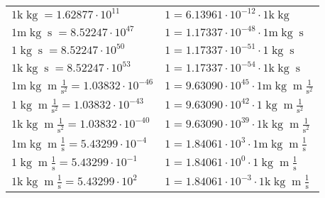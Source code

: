 \begin{center}
\begin{longtable}{l l}
{\color{gray}$1 \bm{\mathrm{ k}}\operatorname{kg}{}{}{}{} = 1.62877\cdot10^{11} $}   & {\color{gray}$ 1 = 6.13961\cdot10^{-12} \cdot 1 \bm{\mathrm{ k}}\operatorname{kg}{}{}{}{}$}  \\
{\color{gray}$1 \bm{\mathrm{ m}}\operatorname{kg}{}{\operatorname{s}}{}{} = 8.52247\cdot10^{47} $}   & {\color{gray}$ 1 = 1.17337\cdot10^{-48} \cdot 1 \bm{\mathrm{ m}}\operatorname{kg}{}{\operatorname{s}}{}{}$}  \\
{\color{black}$1 \bm{\mathrm{ }}\operatorname{kg}{}{\operatorname{s}}{}{} = 8.52247\cdot10^{50} $}   & {\color{black}$ 1 = 1.17337\cdot10^{-51} \cdot 1 \bm{\mathrm{ }}\operatorname{kg}{}{\operatorname{s}}{}{}$}  \\
{\color{gray}$1 \bm{\mathrm{ k}}\operatorname{kg}{}{\operatorname{s}}{}{} = 8.52247\cdot10^{53} $}   & {\color{gray}$ 1 = 1.17337\cdot10^{-54} \cdot 1 \bm{\mathrm{ k}}\operatorname{kg}{}{\operatorname{s}}{}{}$}  \\
{\color{gray}$1 \bm{\mathrm{ m}}\operatorname{kg}{\operatorname{m}}\frac1{\operatorname{s}^2}{}{} = 1.03832\cdot10^{-46} $}   & {\color{gray}$ 1 = 9.63090\cdot10^{45} \cdot 1 \bm{\mathrm{ m}}\operatorname{kg}{\operatorname{m}}\frac1{\operatorname{s}^2}{}{}$}  \\
{\color{black}$1 \bm{\mathrm{ }}\operatorname{kg}{\operatorname{m}}\frac1{\operatorname{s}^2}{}{} = 1.03832\cdot10^{-43} $}   & {\color{black}$ 1 = 9.63090\cdot10^{42} \cdot 1 \bm{\mathrm{ }}\operatorname{kg}{\operatorname{m}}\frac1{\operatorname{s}^2}{}{}$}  \\
{\color{gray}$1 \bm{\mathrm{ k}}\operatorname{kg}{\operatorname{m}}\frac1{\operatorname{s}^2}{}{} = 1.03832\cdot10^{-40} $}   & {\color{gray}$ 1 = 9.63090\cdot10^{39} \cdot 1 \bm{\mathrm{ k}}\operatorname{kg}{\operatorname{m}}\frac1{\operatorname{s}^2}{}{}$}  \\
{\color{gray}$1 \bm{\mathrm{ m}}\operatorname{kg}{\operatorname{m}}\frac1{\operatorname{s}}{}{} = 5.43299\cdot10^{-4} $}   & {\color{gray}$ 1 = 1.84061\cdot10^{3} \cdot 1 \bm{\mathrm{ m}}\operatorname{kg}{\operatorname{m}}\frac1{\operatorname{s}}{}{}$}  \\
{\color{black}$1 \bm{\mathrm{ }}\operatorname{kg}{\operatorname{m}}\frac1{\operatorname{s}}{}{} = 5.43299\cdot10^{-1} $}   & {\color{black}$ 1 = 1.84061\cdot10^{0} \cdot 1 \bm{\mathrm{ }}\operatorname{kg}{\operatorname{m}}\frac1{\operatorname{s}}{}{}$}  \\
{\color{gray}$1 \bm{\mathrm{ k}}\operatorname{kg}{\operatorname{m}}\frac1{\operatorname{s}}{}{} = 5.43299\cdot10^{2} $}   & {\color{gray}$ 1 = 1.84061\cdot10^{-3} \cdot 1 \bm{\mathrm{ k}}\operatorname{kg}{\operatorname{m}}\frac1{\operatorname{s}}{}{}$}  \\

\end{longtable}
\end{center}
